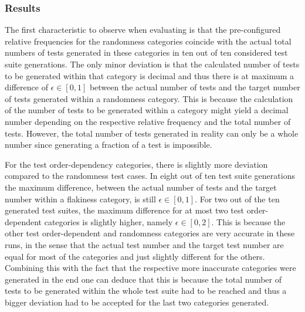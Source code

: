 \documentclass[
fancyheadings, %
%
%
]{stsreprt}
\begin{document}
\subsubsection{Results}
The first characteristic to observe when evaluating is that the pre-configured relative frequencies for the randomness categories coincide with the actual total numbers of tests generated in these categories in ten out of ten considered test suite generations. The only minor deviation is that the calculated number of tests to be generated within that category is decimal and thus there is at maximum a difference of $\epsilon \in [0,1]$ between the actual number of tests and the target number of tests generated within a randomness category. This is because the calculation of the number of tests to be generated within a category might yield a decimal number depending on the respective relative frequency and the total number of tests. 
However, the total number of tests generated in reality can only be a whole number since generating a fraction of a test is impossible. \par
For the test order-dependency categories, there is slightly more deviation compared to the randomness test cases. In eight out of ten test suite generations the maximum difference, between the actual number of tests and the target number within a flakiness category, is still $\epsilon \in [0,1]$. For two out of the ten generated test suites, the maximum difference for at most two test order-dependent categories is slightly higher, namely $\epsilon \in [0,2]$. This is because the other test order-dependent and randomness categories are very accurate in these runs, in the sense that the actual test number and the target test number are equal for most of the categories and just slightly different for the others. Combining this with the fact that the respective more inaccurate categories were generated in the end one can deduce that this is because the total number of tests to be generated within the whole test suite had to be reached and thus a bigger deviation had to be accepted for the last two categories generated.
\end{document}
